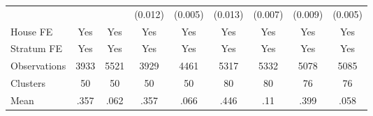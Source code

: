{\begin{tabular}{l*{8}{c}}
                &                  &                  &  (0.012)         &  (0.005)         &  (0.013)         &  (0.007)         &  (0.009)         &  (0.005)         \\
House FE        &      Yes         &      Yes         &      Yes         &      Yes         &      Yes         &      Yes         &      Yes         &      Yes         \\
Stratum FE      &      Yes         &      Yes         &      Yes         &      Yes         &      Yes         &      Yes         &      Yes         &      Yes         \\
\midrule
Observations    &     3933         &     5521         &     3929         &     4461         &     5317         &     5332         &     5078         &     5085         \\
Clusters        &       50         &       50         &       50         &       50         &       80         &       80         &       76         &       76         \\
Mean            &     .357         &     .062         &     .357         &     .066         &     .446         &      .11         &     .399         &     .058         \\
\bottomrule
\end{tabular}
}
